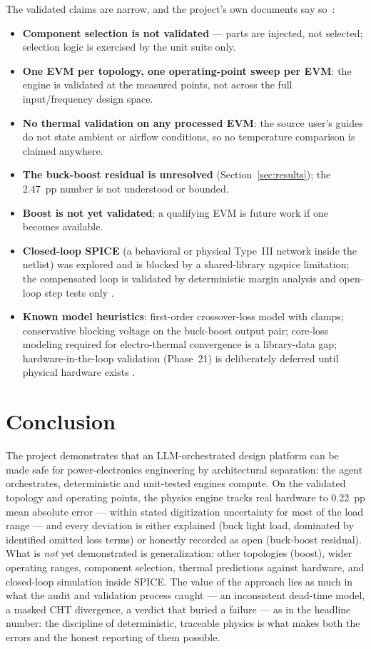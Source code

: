 \documentclass[conference]{IEEEtran}
\begin{document}
The validated claims are narrow, and the project's own documents say
so~\cite{valreport,goals}:
\begin{itemize}
\item \textbf{Component selection is not validated} --- parts are
injected, not selected; selection logic is exercised by the unit suite
only.
\item \textbf{One EVM per topology, one operating-point sweep per EVM}:
the engine is validated at the measured points, not across the full
input/frequency design space.
\item \textbf{No thermal validation on any processed EVM}: the source
user's guides do not state ambient or airflow conditions, so no
temperature comparison is claimed anywhere.
\item \textbf{The buck-boost residual is unresolved} (Section~\ref{sec:results});
the \SI{2.47}{pp} number is not understood or bounded.
\item \textbf{Boost is not yet validated}; a qualifying EVM is future
work if one becomes available.
\item \textbf{Closed-loop SPICE} (a behavioral or physical Type~III
network inside the netlist) was explored and is blocked by a
shared-library ngspice limitation; the compensated loop is validated by
deterministic margin analysis and open-loop step tests only
\cite{goals}.
\item \textbf{Known model heuristics}: first-order crossover-loss model
with clamps; conservative blocking voltage on the buck-boost output
pair; core-loss modeling required for electro-thermal convergence is a
library-data gap; hardware-in-the-loop validation (Phase~21) is
deliberately deferred until physical hardware exists \cite{goals}.
\end{itemize}

\section{Conclusion}
The project demonstrates that an LLM-orchestrated design platform can be
made safe for power-electronics engineering by architectural separation:
the agent orchestrates, deterministic and unit-tested engines compute.
On the validated topology and operating points, the physics engine
tracks real hardware to \SI{0.22}{pp} mean absolute error --- within
stated digitization uncertainty for most of the load range --- and every
deviation is either explained (buck light load, dominated by identified
omitted loss terms) or honestly recorded as open (buck-boost residual).
What is \emph{not} yet demonstrated is generalization: other topologies
(boost), wider operating ranges, component selection, thermal
predictions against hardware, and closed-loop simulation inside SPICE.
The value of the approach lies as much in what the audit and validation
process caught --- an inconsistent dead-time model, a masked CHT
divergence, a verdict that buried a failure --- as in the headline
number: the discipline of deterministic, traceable physics is what makes
both the errors and the honest reporting of them possible.
\end{document}
